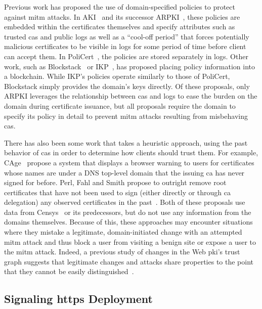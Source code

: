 Previous work has proposed the use of domain-specified policies to protect
against \ac{mitm} attacks. In AKI~\cite{kim2013accountable} and its successor
ARPKI~\cite{basin2014arpki}, these policies are embedded within the certificates
themselves and specify attributes such as trusted \acp{ca} and public logs as
well as a ``cool-off period'' that forces potentially malicious certificates to
be visible in logs for some period of time before client can accept them. In
PoliCert~\cite{szalachowski2014policert}, the policies are stored separately in
logs. Other work, such as Blockstack~\cite{ali2016blockstack} or
IKP~\cite{matsumoto2017ikp}, has proposed placing policy information into a
blockchain. While IKP's policies operate similarly to those of PoliCert,
Blockstack simply provides the domain's keys directly. Of these proposals, only
ARPKI leverages the relationship between \acp{ca} and logs to ease the burden on
the domain during certificate issuance, but all proposals require the domain to
specify its policy in detail to prevent \ac{mitm} attacks resulting from
misbehaving \acp{ca}. 

There has also been some work that takes a heuristic approach, using the past
behavior of \acp{ca} in order to determine how clients should trust them. For
example, CAge~\cite{kasten2013cage} propose a system that displays a browser
warning to users for certificates whose names are under a DNS top-level domain
that the issuing \ac{ca} has never signed for before. Perl, Fahl and Smith
propose to outright remove root certificates that have not been used to sign
(either directly or through \ac{ca} delegation) any observed certificates in the
past~\cite{perl2014you}. Both of these proposals use data from
Censys~\cite{durumeric2015search} or its predecessors, but do not use any
information from the domains themselves. Because of this, these approaches may
encounter situations where they mistake a legitimate, domain-initiated change
with an attempted \ac{mitm} attack and thus block a user from visiting a benign
site or expose a user to the \ac{mitm} attack. Indeed, a previous study of
changes in the Web \ac{pki}'s trust graph suggests that legitimate changes and
attacks share properties to the point that they cannot be easily
distinguished~\cite{amann2013no}.

\subsection{Signaling \ac{https} Deployment}
\label{sec:background:signaling}

